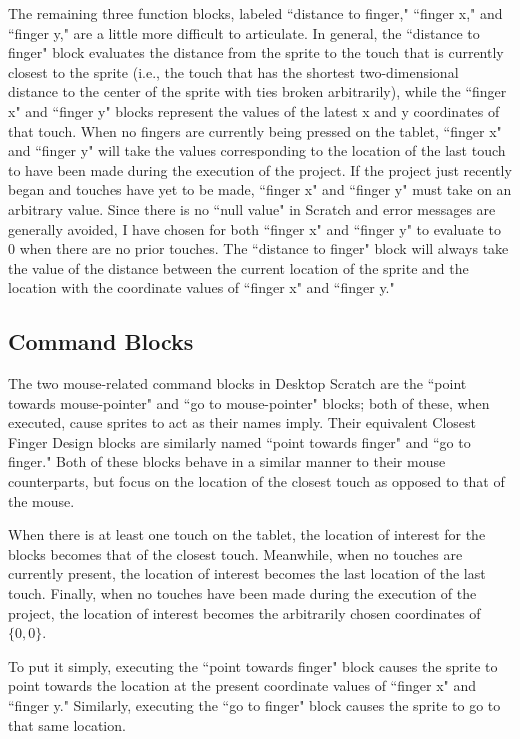 The remaining three function blocks, labeled ``distance to finger," ``finger x," and ``finger y," are a little more difficult to articulate. In general, the ``distance to finger" block evaluates the distance from the sprite to the touch that is currently closest to the sprite (i.e., the touch that has the shortest two-dimensional distance to the center of the sprite with ties broken arbitrarily), while the ``finger x" and ``finger y" blocks represent the values of the latest x and y coordinates of that touch. When no fingers are currently being pressed on the tablet, ``finger x" and ``finger y" will take the values corresponding to the location of the last touch to have been made during the execution of the project. If the project just recently began and touches have yet to be made, ``finger x" and ``finger y" must take on an arbitrary value. Since there is no ``null value" in Scratch and error messages are generally avoided, I have chosen for both ``finger x" and ``finger y" to evaluate to $0$ when there are no prior touches. The ``distance to finger" block will always take the value of the distance between the current location of the sprite and the location with the coordinate values of ``finger x" and ``finger y."

\subsection{Command Blocks}
The two mouse-related command blocks in Desktop Scratch are the ``point towards mouse-pointer" and ``go to mouse-pointer" blocks; both of these, when executed, cause sprites to act as their names imply. Their equivalent Closest Finger Design blocks are similarly named ``point towards finger" and ``go to finger." Both of these blocks behave in a similar manner to their mouse counterparts, but focus on the location of the closest touch as opposed to that of the mouse.  

When there is at least one touch on the tablet, the location of interest for the blocks becomes that of the closest touch. Meanwhile, when no touches are currently present, the location of interest becomes the last location of the last touch. Finally, when no touches have been made during the execution of the project, the location of interest becomes the arbitrarily chosen coordinates of $\{0,0\}$.

To put it simply, executing the ``point towards finger" block causes the sprite to point towards the location at the present coordinate values of ``finger x" and ``finger y." Similarly, executing the ``go to finger" block causes the sprite to go to that same location. 

